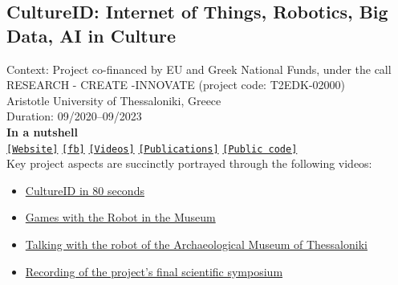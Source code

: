 \subsection{CultureID: Internet of Things, Robotics, Big Data, AI in Culture}

\noindent Context: Project co-financed by EU and Greek National Funds, under the call RESEARCH - CREATE -INNOVATE (project code: T2EDK-02000)\\
\noindent Aristotle University of Thessaloniki, Greece\\
\noindent Duration: 09/2020--09/2023\\

\noindent \textbf{In a nutshell}\\
\noindent \href{https://cultureid.web.auth.gr/?page_id=216&lang=en}{\texttt{[Website]}} \href{https://www.facebook.com/cultureID.Auth}{\texttt{[fb]}} \href{https://www.youtube.com/@cultureidproject}{\texttt{[Videos]}} \href{https://cultureid.web.auth.gr/?page_id=490}{\texttt{[Publications]}} \href{https://github.com/cultureid-auth-ros-packages}{\texttt{[Public code]}}\\


\noindent Key project aspects are succinctly portrayed through the following videos:

\begin{itemize}
  \singlespacing
  \item \href{https://www.youtube.com/watch?v=SOA0To077WQ}{CultureID in 80 seconds}
  \item \href{https://www.youtube.com/watch?v=2EvTGNOqTrs}{Games with the Robot in the Museum}
  \item \href{https://www.youtube.com/watch?v=mrTL3Gep7Xk}{Talking with the robot of the Archaeological Museum of Thessaloniki}
  \item \href{https://www.youtube.com/watch?v=i5CUBswHWf0}{Recording of the project's final scientific symposium}
\end{itemize}

